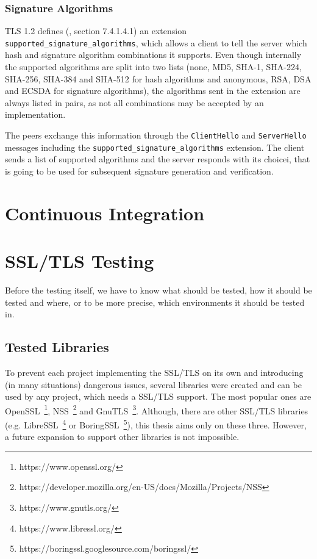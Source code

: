 \subsection{Signature Algorithms}
    TLS 1.2 defines (\cite{rfc5246}, section 7.4.1.4.1) an extension
    \texttt{supported\_signature\_algorithms}, which allows a client to tell
    the server which hash and signature algorithm combinations it supports.
    Even though internally the supported algorithms are split into two lists
    (none, MD5, SHA-1, SHA-224, SHA-256, SHA-384 and SHA-512 for hash algorithms
    and anonymous, RSA, DSA and ECSDA for signature algorithms), the algorithms
    sent in the extension are always listed in pairs, as not all combinations
    may be accepted by an implementation.

    The peers exchange this information through the \texttt{ClientHello} and
    \texttt{ServerHello} messages including the \texttt{supported\_signature\_algorithms}
    extension. The client sends a list of supported algorithms and the server
    responds with its choicei, that is going to be used for subsequent signature
    generation and verification.


\chapter{Continuous Integration}

\chapter {SSL/TLS Testing}
    Before the testing itself, we have to know what should be tested, how it
    should be tested and where, or to be more precise, which environments it
    should be tested in.

\section{Tested Libraries}
    To prevent each project implementing the SSL/TLS on its own and introducing
    (in many situations) dangerous issues, several libraries were created and
    can be used by any project, which needs a SSL/TLS support. The most
    popular ones are OpenSSL~\footnote{https://www.openssl.org/},
    NSS~\footnote{https://developer.mozilla.org/en-US/docs/Mozilla/Projects/NSS}
    and GnuTLS~\footnote{https://www.gnutls.org/}. Although, there are other
    SSL/TLS libraries (e.g. LibreSSL~\footnote{https://www.libressl.org/} or
    BoringSSL~\footnote{https://boringssl.googlesource.com/boringssl/}),
    this thesis aims only on these three. However, a future
    expansion to support other libraries is not impossible.


